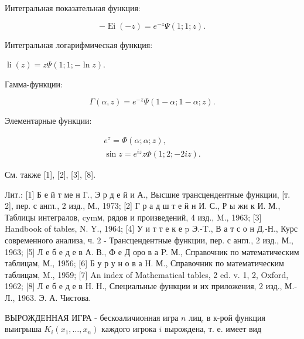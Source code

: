 \documentclass[10pt]{article}
\begin{document}
Интегральная показательная функция:



\[

-\operatorname{Ei}(-z)=e^{-z} \Psi(1 ; 1 ; z) .

\]



Интегральная логарифмическая функция:



$\operatorname{li}(z)=z \Psi(1 ; 1 ;-\ln z)$.



Гамма-функции:



\[

\Gamma(\alpha, z)=e^{-z} \Psi(1-\alpha ; 1-\alpha ; z) .

\]



Элементарные функции:



\[

\begin{gathered}

e^{z}=\Phi(\alpha ; \alpha ; z), \\

\sin z=e^{i z} z \Phi(1 ; 2 ;-2 i z) .

\end{gathered}

\]



См. также [1], [2], [3], [8].



Лит.: [1] Б е й т ме н Г., Э р д е й и А., Высшие трансцендентные функции, [т. 2], пер. с англ., 2 изд., М., 1973; [2] Г р а д ш т е й н И. С., Р ы жи к И. М., Таблицы интегралов, cymм, рядов и произведений, 4 изд., M., 1963; [3] Handbook of tables, N. Y., 1964; [4] У и т т е к е p Э.-T., В а т с о н Д.-Н., Курс современного анализа, ч. 2 - Трансцендентные функции, пер. с англ., 2 изд., М., 1963; [5] Л е б е д е в А. В., $Ф$ е Д оро в а P. М., Справочник по математическим таблицам, М., 1956; [6] Б у р у н о в а Н. М., Справочник по математическим таблицам, M., 1959; [7] An index of Mathematical tables, 2 ed. v. 1, 2, Oxford, 1962; [8] Л е б е д е в Н. Н., Специальные функции и их приложения, 2 изд., М.-Л., 1963. Э. А. Чистова.



ВЫРОЖДЕННАЯ ИГРА - бескоаличионная игра $n$ лиц, в к-рой функция выигрыша $K_{i}\left(x_{1}, \ldots, x_{n}\right)$ каждого игрока $i$ вырождена, т. е. имеет вид
\end{document}

